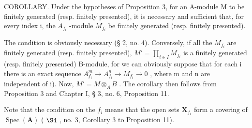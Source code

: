 COROLLARY. Under the hypotheses of Proposition 3, for an A-module M to be finitely generated (resp. finitely presented), it is necessary and sufficient that, for every index i, the \(A_{f_{i}}\) -module \(M_{f_{i}}\) be finitely generated (resp. finitely presented).

The condition is obviously necessary (§ 2, no. 4). Conversely, if all the \(M_{f_{i}}\) are finitely generated (resp. finitely presented), \(M' = \prod_{i \in I} M_{f_{i}}\) is a finitely generated (resp. finitely presented) B-module, for we can obviously suppose that for each i there is an exact sequence \(A_{f_i}^{m} \to A_{f_i}^{n} \to M_{f_i} \to 0\) , where m and n are independent of i). Now, \(M' = M \otimes_{A} B\) . The corollary then follows from Proposition 3 and Chapter I, § 3, no. 6, Proposition 11.

Note that the condition on the \(f_{i}\) means that the open sets \(\mathbf{X}_{f_{i}}\) form a covering of \(\operatorname{Spec}(\mathbf{A})\) ( \(\S 4\) , no. 3, Corollary 3 to Proposition 11).

